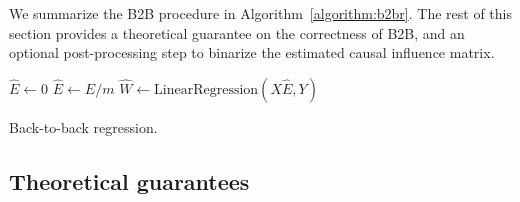 \documentclass{article}
\begin{document}
We summarize the B2B procedure in Algorithm~\ref{algorithm:b2br}.
%
The rest of this section provides a theoretical guarantee on the correctness of B2B, and an optional post-processing step to binarize the estimated causal influence matrix.


\begin{algorithm}[H]
    $\hat{E} \leftarrow 0$\;
    $\hat{E} \leftarrow \hat{E} / m$\;
    $\hat{W} \leftarrow \text{LinearRegression}(X \hat{E}, Y)$\;
    \caption{Back-to-back regression.}
    \label{algorithm:b2br}
\end{algorithm}

\subsection{Theoretical guarantees}
\label{sec:theorem}
\end{document}
